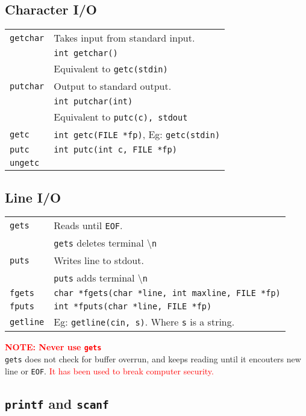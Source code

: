 \subsection{Character I/O}
\begin{tabularx}{\linewidth}{lX}
\texttt{getchar} & Takes input from standard input.\\
& \texttt{int getchar()}\\
& Equivalent to \texttt{getc(stdin)}\\
\texttt{putchar} & Output to standard output.\\
& \texttt{int putchar(int)}\\
& Equivalent to \texttt{putc(c), stdout}\\
\texttt{getc} & \texttt{int getc(FILE *fp)}, Eg: \texttt{getc(stdin)}\\
\texttt{putc} & \texttt{int putc(int c, FILE *fp)}\\
\texttt{ungetc} & \\
\end{tabularx}

\subsection{Line I/O}
\begin{tabularx}{\linewidth}{lX}
\texttt{gets} & Reads until \texttt{EOF}.\\
& \texttt{gets} deletes terminal \textbackslash \texttt{n}\\
\texttt{puts} & Writes line to stdout.\\
& \texttt{puts} adds terminal \textbackslash \texttt{n}\\
\texttt{fgets} & \texttt{char *fgets(char *line, int maxline, FILE *fp)}\\
\texttt{fputs} & \texttt{int *fputs(char *line, FILE *fp)}\\
\texttt{getline} & Eg: \texttt{getline(cin, s)}. Where \texttt{s} is a string.
\end{tabularx}

\begin{mdframed}
\textbf{\textcolor{red}{NOTE: Never use \texttt{gets}}}\\
\texttt{gets} does not check for buffer overrun, and keeps reading until it encouters new line or \texttt{EOF}.
\textcolor{red}{It has been used to break computer security.}
\end{mdframed}

\vfill \null

\subsection{\texttt{printf} and \texttt{scanf}}
